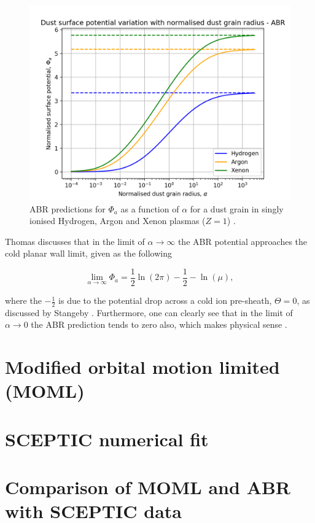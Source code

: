 \documentclass{article}
\begin{document}
\begin{figure}[H]
\centering
\includegraphics[width=\linewidth]{Output/ABRgraph.jpeg}
\caption{ABR predictions for $\Phi_a$ as a function of $\alpha$ for a dust grain in singly ionised Hydrogen, Argon and Xenon plasmas ($Z=1$) \cite{ABR} \cite{Thomas}.}
\label{ABR} 
\end{figure}

Thomas \cite{Thomas} discusses that in the limit of $\alpha \to \infty$ the ABR potential approaches
the cold planar wall limit, given as the following 

\begin{equation}\label{eq:ABRLim}
\lim_{\alpha \to \infty} \Phi_a = \frac{1}{2}\ln{\left(2 \pi \right)} - \frac{1}{2} - \ln{\left(\mu \right)},
\end{equation}

\noindent where the $-\frac{1}{2}$ is due to the potential drop across a cold ion pre-sheath, $\Theta = 0$,
as discussed by Stangeby \cite{Stangeby1986}. Furthermore, one can clearly see that in the limit
of $\alpha \to 0$ the ABR prediction tends to zero also, which makes physical sense \cite{ABR}.



\section{Modified orbital motion limited (MOML)}
\section{SCEPTIC numerical fit}
\section{Comparison of MOML and ABR with SCEPTIC data}
\end{document}

